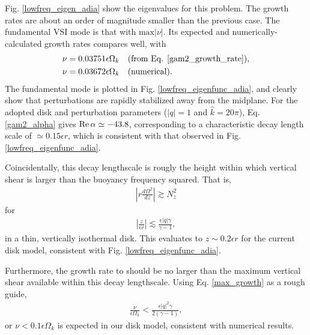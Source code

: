 Fig. \ref{lowfreq_eigen_adia} show the eigenvalues for this
problem. The growth rates are about an order of magnitude smaller than
the previous case. The fundamental VSI mode is that with
$\mathrm{max}|\nu|$. Its expected and numerically-calculated growth
rates compares well, with 
\begin{align*}
  \nu = 0.03751 \epsilon \Omega_k &\quad \text{(from
    Eq. \ref{gam2_growth_rate})},\\
  \nu = 0.03672 \epsilon \Omega_k &\quad \text{(numerical)}.
\end{align*}
The fundamental mode is plotted in Fig. \ref{lowfreq_eigenfunc_adia},
and clearly show that perturbations are rapidly stabilized away from
the midplane. For the adopted disk and perturbation parameters 
($|q|=1$ and $\hat{k} = 20\pi$), Eq. \ref{gam2_alpha} gives $\operatorname{Re}{\alpha}\simeq - 43.8$,
corresponding to a characteristic decay length scale of $\simeq
0.15\epsilon r$, which is consistent with that observed in 
Fig. \ref{lowfreq_eigenfunc_adia}. 

Coincidentally, this decay lengthscale is rougly the height within which
vertical shear is larger than the buoyancy frequency squared. That is,
\begin{align*}
\left|r\frac{d\Omega^2}{dz}\right|\gtrsim N_z^2
\end{align*}
for
\begin{align*}
  \left|\frac{z}{\epsilon r}\right| \lesssim \frac{\epsilon|q|\gamma}{\gamma-1},
\end{align*}
in a thin, vertically isothermal disk. This evaluates to $z\sim
0.2\epsilon r$ for the current disk model, consistent with
Fig. \ref{lowfreq_eigenfunc_adia}. 

Furthermore, the growth rate to should be no larger than the
maximum vertical shear available within this decay lengthscale. Using 
Eq. \ref{max_growth} as a rough guide, 
\begin{align}
  \frac{\nu}{\epsilon\Omega_k}<\frac{\epsilon |q|^2\gamma}{2(\gamma-1)},
\end{align}
or $\nu< 0.1\epsilon\Omega_k$ is expected in our disk model,
consistent with numerical results. 


